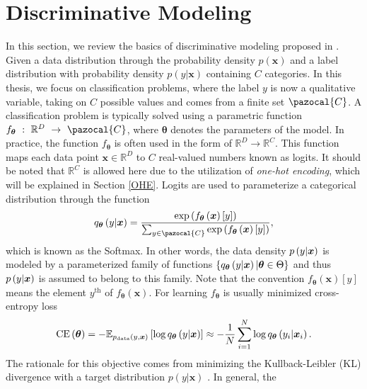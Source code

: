 \section{Discriminative Modeling}
In this section, we review the basics of discriminative modeling proposed in \cite{HDGEmain}. Given a data distribution through the probability density $p(\boldsymbol{x})$ and a label distribution with probability density $p(y|\boldsymbol{x})$ containing $C$ categories. In this thesis, we focus on classification problems, where the label $y$ is now a qualitative variable, taking on $C$ possible values and comes from a finite set $\pazocal{C}$.  A classification problem is typically solved using a parametric function $f_{\boldsymbol{\theta}}~:~\mathbb{R}^D~\to~\pazocal{C}$, where $\boldsymbol{\theta}$ denotes the parameters of the model. In practice, the function $f_{\boldsymbol{\theta}}$ is often used in the form of $\mathbb{R}^D \to  \mathbb{R}^C$. This function maps each data point $\boldsymbol{x} \in \mathbb{R}^D$ to $C$ real-valued numbers known as logits. It should be noted that $\mathbb{R}^C$ is allowed here due to the utilization of \emph{one-hot encoding}, which will be explained in Section \ref{OHE}. Logits are used to parameterize a categorical distribution through the function
\begin{equation}\label{softmax}
	q_{\boldsymbol{\theta}}\left(y|\boldsymbol{x}\right) = \frac{\exp\left({f_{\boldsymbol{\theta}}\left(\boldsymbol{x}\right)[y]}\right)}{\sum_{y\in\pazocal{C}}\exp\left({f_{\boldsymbol{\theta}}\left(\boldsymbol{x}\right)[y]}\right)},
\end{equation}
which is known as the Softmax. In other words, the data density $p\left(y\vert \boldsymbol{x}\right)$ is modeled by a parameterized family of functions $\left\lbrace q_{\boldsymbol{\theta}}\left(y\vert \boldsymbol{x}\right) \vert \boldsymbol{\theta} \in \Theta  \right\rbrace$ and thus $p\left(y\vert\boldsymbol{x}\right)$ is assumed to belong to this family.   Note that the convention $f_{\boldsymbol{\theta}}\left(\boldsymbol{x}\right)[y]$ means the element $y^{\mathrm{th}}$ of $f_{\boldsymbol{\theta}}\left(\boldsymbol{x}\right)$. For learning $f_{\boldsymbol{\theta}}$ is usually minimized cross-entropy loss 
\begin{equation}\label{crossentropy}
     \mathrm{CE}\left(\boldsymbol{\theta}\right)=-\mathbb{E}_{p_{\mathrm{data}}\left(y,\boldsymbol{x}\right)}\left[\log q_{\boldsymbol{\theta}}\left(y|\boldsymbol{x}\right)\right] \approx -\frac{1}{N}\sum_{i=1}^N\log q_{\boldsymbol{\theta}}\left(y_i|\boldsymbol{x}_i\right).
\end{equation} 
The rationale for this objective comes from minimizing the Kullback-Leibler (KL) divergence with a target distribution $p(y| \boldsymbol{x})$ \cite{KL}. In general, the
